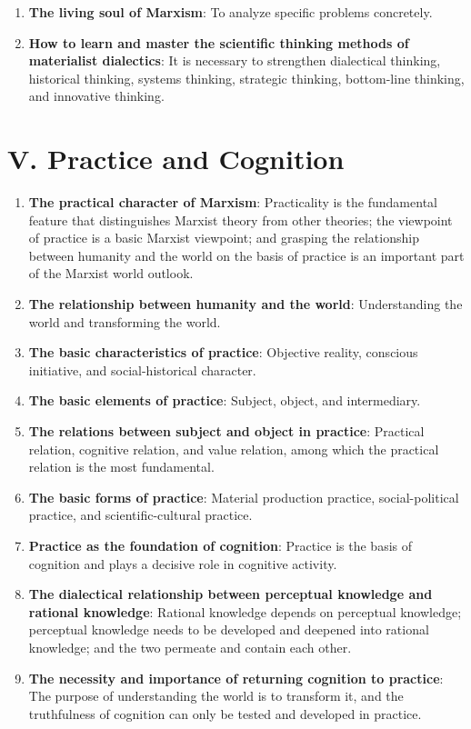 \documentclass[12pt,a4paper]{ctexart}
\begin{document}
\begin{enumerate}[leftmargin=2em]
    \item \textbf{The living soul of Marxism}: To analyze specific problems concretely.
    
    \item \textbf{How to learn and master the scientific thinking methods of materialist dialectics}: It is necessary to strengthen dialectical thinking, historical thinking, systems thinking, strategic thinking, bottom-line thinking, and innovative thinking.
\end{enumerate}

\section{V. Practice and Cognition}

\begin{enumerate}[leftmargin=2em]
    \item \textbf{The practical character of Marxism}: Practicality is the fundamental feature that distinguishes Marxist theory from other theories; the viewpoint of practice is a basic Marxist viewpoint; and grasping the relationship between humanity and the world on the basis of practice is an important part of the Marxist world outlook.
    
    \item \textbf{The relationship between humanity and the world}: Understanding the world and transforming the world.
    
    \item \textbf{The basic characteristics of practice}: Objective reality, conscious initiative, and social-historical character.
    
    \item \textbf{The basic elements of practice}: Subject, object, and intermediary.
    
    \item \textbf{The relations between subject and object in practice}: Practical relation, cognitive relation, and value relation, among which the practical relation is the most fundamental.
    
    \item \textbf{The basic forms of practice}: Material production practice, social-political practice, and scientific-cultural practice.
    
    \item \textbf{Practice as the foundation of cognition}: Practice is the basis of cognition and plays a decisive role in cognitive activity.
    
    \item \textbf{The dialectical relationship between perceptual knowledge and rational knowledge}: Rational knowledge depends on perceptual knowledge; perceptual knowledge needs to be developed and deepened into rational knowledge; and the two permeate and contain each other.
    
    \item \textbf{The necessity and importance of returning cognition to practice}: The purpose of understanding the world is to transform it, and the truthfulness of cognition can only be tested and developed in practice.
\end{enumerate}
\end{document}
